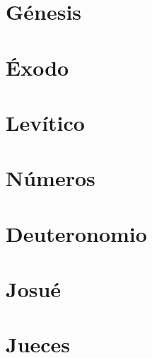 \chapter{Génesis}
\begin{multicols}{2}
  \parskip=0pt \relax
  
\end{multicols}

\chapter{Éxodo}
\begin{multicols}{2}
  \parskip=0pt \relax
  
\end{multicols}

\chapter{Levítico}
\begin{multicols}{2}
  \parskip=0pt \relax
  
\end{multicols}

\chapter{Números}
\begin{multicols}{2}
  \parskip=0pt \relax
  
\end{multicols}

\chapter{Deuteronomio}
\begin{multicols}{2}
  \parskip=0pt \relax
  
\end{multicols}

\chapter{Josué}
\begin{multicols}{2}
  \parskip=0pt \relax
  
\end{multicols}

\chapter{Jueces}
\begin{multicols}{2}
  \parskip=0pt \relax
  
\end{multicols}

